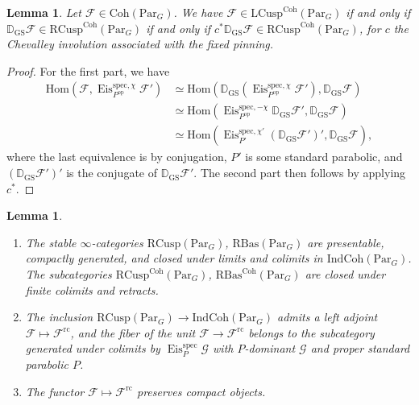 \documentclass{amsart}
\newtheorem{lemma}[theorem]{Lemma}
\theoremstyle{definition}
\theoremstyle{remark}
\numberwithin{equation}{section}
\newcommand{\mc}{\mathcal}
\newcommand{\Hom}{\mathrm{Hom}}
\newcommand{\spec}{\mathrm{spec}}
\newcommand{\op}{\mathrm{op}}
\newcommand{\D}{\mathbb{D}}
\newcommand{\Par}{\mathrm{Par}}
\newcommand{\IndCoh}{\mathrm{IndCoh}}
\DeclareMathOperator{\Eis}{\mathrm{Eis}}
\newcommand{\Coh}{\mathrm{Coh}}
\newcommand{\LCusp}{\mathrm{LCusp}}
\newcommand{\RCusp}{\mathrm{RCusp}}
\newcommand{\GS}{\mathrm{GS}}
\newcommand{\rc}{\mathrm{rc}}
\newcommand{\RBas}{\mathrm{RBas}}
\begin{document}
\begin{lemma}{\label{lem: leftrightcuspduality}}
    Let $\mc F\in \Coh(\Par_G) $. We have $\mc{F} \in \LCusp^{\Coh}(\Par_G)$ if and only if $\D_{\GS}\mc{F} 
    \in \RCusp^{\Coh}(\Par_G)$ if and only if $c^* \D_{\GS}\mc{F} 
    \in \RCusp^{\Coh}(\Par_G)$, for $c$ the Chevalley involution associated with the fixed pinning. 
\end{lemma}
\begin{proof}
For the first part, we have
    \begin{align*}
        \Hom(\mc{F}, \Eis^{\spec, \chi}_{P^{\op}} \mc{F}') &\simeq \Hom(\D_{\GS}(\Eis^{\spec, \chi}_{P^{\op}} \mc{F}'), \D_{\GS}\mc{F}) \\ & \simeq \Hom(\Eis^{\spec, -\chi}_{P^{\op}} \D_{\GS}\mc{F}', \D_{\GS}\mc{F})\\
        & \simeq \Hom(\Eis^{\spec, \chi'}_{P'} (\D_{\GS}\mc{F}')', \D_{\GS}\mc{F}),
    \end{align*}
    where the last equivalence is by conjugation, $P'$ is some standard parabolic, and $(\D_{\GS}\mc{F}')'$ is the conjugate of $\D_{\GS}\mc{F}'$. The second part then follows by applying $c^{\ast}$.
\end{proof}

\begin{lemma}\label{lem:RCusp(ParG)Presentable}
\begin{enumerate}
    \item The stable $\infty$-categories $\RCusp(\Par_G)$, $\RBas(\Par_G)$ are presentable, compactly generated, and closed under limits and colimits in $\IndCoh(\Par_G)$. The subcategories $\RCusp^\Coh(\Par_G)$, $\RBas^\Coh(\Par_G)$ are closed under finite colimits and retracts. 
    \item The inclusion $\RCusp(\Par_G)\to \IndCoh(\Par_G)$ admits a left adjoint $\mc F\mapsto \mc F^\rc$, and the fiber of the unit $\mc F \to \mc F^{\rc}$
    belongs to the subcategory generated under colimits by $\Eis_{P}^{\spec} \mc{G}$ with $P$-dominant $\mc{G}$ and proper standard parabolic $P$. 
    \item The functor $\mc{F} \mapsto \mc F^\rc$ preserves compact objects. 
\end{enumerate}
\end{lemma}
\end{document}
